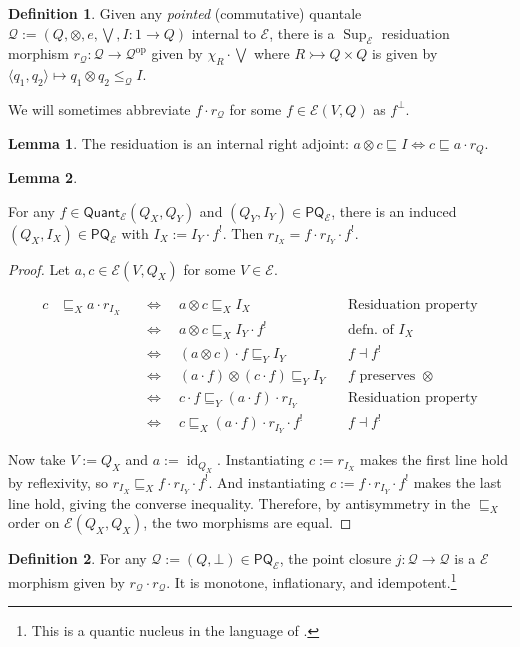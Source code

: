 \documentclass{article}
\makeatletter
\newcommand{\allproofs}{} %
\newif\ifproofsinappendix
\newcommand{\lemmawithproof}[3]{%
  \begin{lemma}\label{#1}
    #2  
    \ifproofsinappendix \hyperref[xxx#1]{(Proof)} \fi
  \end{lemma}
    \ifproofsinappendix
  \g@addto@macro\allproofs{%
    \par\medskip
    \noindent
    \subsection*{\cref{#1}}\par
    #2\par
    \begin{proof}\label{xxx#1}
      #3
    \end{proof}%
  }
      \else

    \begin{proof}
      #3
    \end{proof}
    \fi 
}
\theoremstyle{definition}
\newtheorem{definition}{Definition}[section]
\newtheorem{lemma}{Lemma}[section]
\newcommand{\cE}{\mathcal{E}}
\newcommand{\cQ}{\mathcal{Q}}
\newcommand{\cat}[1]{\mathsf{#1}}
\newcommand{\op}{\operatorname{op}}
\newcommand{\id}{\operatorname{id}}
\newcommand{\Sup}{\operatorname{Sup}}
\makeatother
\begin{document}
\begin{definition}
    \label{def:resid}
Given any {\it pointed} (commutative) quantale $\cQ := (Q,\otimes,e,\bigvee,I\colon 1\to Q)$ internal to $\cE$, there is a $\Sup_\cE$ residuation morphism $r_\cQ\colon \cQ \to \cQ^{\op}$ given by $\chi_R \cdot \bigvee$ where $R\rightarrowtail Q \times Q$ is given by $\langle q_1,q_2\rangle\mapsto q_1\otimes q_2\leq_\cQ I$. 
\end{definition}

We will sometimes abbreviate $f\cdot r_\cQ$ for some $f\in \cE(V,Q)$ as $f^\bot$. 

\begin{lemma}
    \label{lemma:residadj}
    The residuation is an internal right adjoint: $a\otimes c \sqsubseteq I \iff c
    \sqsubseteq a \cdot r_Q$.
\end{lemma}


\lemmawithproof{lemma:conj}{
For any $f\in \cat{Quant_\cE}(Q_X, Q_Y)$ and $(Q_Y,I_Y)\in\cat{PQ_\cE}$, there is an induced $(Q_X,I_X)\in\cat{PQ_\cE}$ with $I_X:=I_Y\cdot f^!$. 
Then $r_{I_X} = f \cdot r_{I_Y} \cdot f^!$.
}{
    Let $a,c \in \cE(V,Q_X)$ for some $V\in \cE$.  

\begin{align*}
   c &\sqsubseteq_X a\cdot r_{I_X}
     &&\iff\quad a\otimes c \sqsubseteq_X I_X &&\text{Residuation property}\\
     &&&\iff\quad a\otimes c \sqsubseteq_X I_Y\cdot f^! &&\text{defn.\ of }I_X\\
     &&&\iff\quad (a\otimes c)\cdot f \sqsubseteq_Y I_Y &&f\dashv f^!\\
     &&&\iff\quad (a\cdot f)\otimes(c\cdot f) \sqsubseteq_Y I_Y &&f\text{ preserves }\otimes\\
     &&&\iff\quad c\cdot f \sqsubseteq_Y (a\cdot f)\cdot r_{I_Y} &&\text{Residuation property}\\
     &&&\iff\quad c \sqsubseteq_X (a\cdot f)\cdot r_{I_Y}\cdot f^! &&f\dashv f^!
\end{align*}

Now take $V:=Q_X$ and $a:=\id_{Q_X}$. 
Instantiating $c:=r_{I_X}$ makes the first line hold by reflexivity, so $r_{I_X}\sqsubseteq_X f\cdot r_{I_Y}\cdot f^!$. 
And instantiating $c:=f\cdot r_{I_Y}\cdot f^!$ makes the last line hold, giving the converse inequality. 
Therefore, by antisymmetry in the $\sqsubseteq_X$ order on $\cE(Q_X,Q_X)$, the two morphisms are equal.
    
}


\begin{definition}
    \label{def:pointclosure}
    For any $\cQ:=(Q,\bot)\in\cat{PQ}_\cE$, the point closure $j\colon \cQ\to \cQ$ is a $\cE$ morphism given by $r_\cQ\cdot r_\cQ$. It is monotone, inflationary, and idempotent.\footnote{This is a quantic nucleus in the language of \cite{rosenthal1990note}.}
\end{definition}
\end{document}
